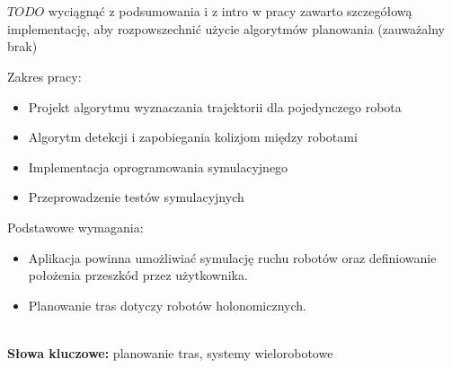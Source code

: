 \\

\\

\begin{singlespacing}

$TODO$ wyciągnąć z podsumowania i z intro
w pracy zawarto szczegółową implementację, aby rozpowszechnić użycie algorytmów planowania (zauważalny brak)

Zakres pracy:
\begin{itemize}
	\item Projekt algorytmu wyznaczania trajektorii dla pojedynczego robota
	\item Algorytm detekcji i zapobiegania kolizjom między robotami
	\item Implementacja oprogramowania symulacyjnego
	\item Przeprowadzenie testów symulacyjnych
\end{itemize}

Podstawowe wymagania:
\begin{itemize}
	\item Aplikacja powinna umożliwiać symulację ruchu robotów oraz definiowanie położenia przeszkód przez użytkownika.
	\item Planowanie tras dotyczy robotów holonomicznych.
\end{itemize}


\flushbottom
\textbf{\\Słowa kluczowe: }planowanie tras, systemy wielorobotowe
\end{singlespacing}
